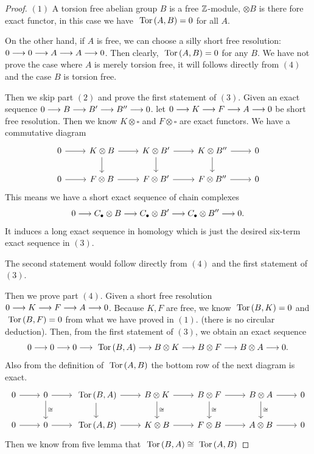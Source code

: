 \documentclass[11pt]{book} %
\begin{document}
\begin{proof}
$(1)$ A torsion free abelian group $B$ is a free $\mathbb Z$-module, $\otimes B$ is there fore exact functor, in this case we have $\text{ Tor\,}(A,B)=0$ for all $A$. 

On the other hand, if $A$ is free, we can choose a silly short free resolution: $0\longrightarrow 0\longrightarrow A\longrightarrow A\longrightarrow 0$. Then clearly, $\text{ Tor\,}(A,B)=0$ for any $B$. We have not prove the case where $A$ is merely torsion free, it will follows directly from $(4)$ and the case $B$ is torsion free. 

Then we skip part $(2)$ and prove the first statement of  $(3)$.
Given an exact sequence $0\longrightarrow B\longrightarrow B'\longrightarrow B''\longrightarrow 0$. let $0\longrightarrow K\longrightarrow F\longrightarrow A\longrightarrow 0$ be short free resolution. Then we know $K\otimes \square$ and $F\otimes \square$ are exact functors. We have a commutative diagram
$$
\begin{tikzcd}
0 \arrow[r] & K\otimes B \arrow[r] \arrow[d] & K\otimes B' \arrow[r] \arrow[d] & K\otimes B'' \arrow[r] \arrow[d] & 0 \\
0 \arrow[r] & F\otimes B \arrow[r] & F\otimes B' \arrow[r] & F\otimes B'' \arrow[r] & 0
\end{tikzcd}
$$
This means we have a short exact sequence of chain complexes
$$
0\longrightarrow C_\bullet\otimes B\longrightarrow C_\bullet\otimes B'\longrightarrow C_\bullet\otimes B''\longrightarrow 0.
$$
It induces a long exact sequence in homology which is just the desired six-term exact sequence in $(3)$. 

The second statement would follow directly from $(4)$ and the first statement of $(3)$.

Then we prove part $(4)$. Given a short free resolution $0\longrightarrow K\longrightarrow F\longrightarrow A\longrightarrow 0$. Because $K,F$ are free, we know $\text{ Tor\,}(B,K)=0$ and $\text{ Tor\,}(B,F)=0$ from what we have proved in $(1)$. (there is no circular deduction).  Then, from the first statement of $(3)$, we obtain an exact sequence
$$
0\longrightarrow 0\longrightarrow 0\longrightarrow \text{ Tor\,}(B,A)\longrightarrow B\otimes K\longrightarrow B\otimes F\longrightarrow B\otimes A\longrightarrow 0.
$$
Also from the definition of $\text{ Tor\,}(A,B)$ the bottom row of the next  diagram is exact.
$$
\begin{tikzcd}
0 \arrow[r] & 0 \arrow[d, "\cong"] \arrow[r] & \tor(B,A) \arrow[d] \arrow[r] & B\otimes K \arrow[d, "\cong"] \arrow[r] & B\otimes F \arrow[d, "\cong"] \arrow[r] & B\otimes A \arrow[d, "\cong"] \arrow[r] & 0 \\
0 \arrow[r] & 0 \arrow[r] & \tor(A,B) \arrow[r] & K\otimes B \arrow[r] & F\otimes B \arrow[r] & A\otimes B \arrow[r] & 0
\end{tikzcd}
$$
Then we know from five lemma that $\text{ Tor\,}(B,A)\cong \text{ Tor\,}(A,B)$


\end{proof}
\end{document}
